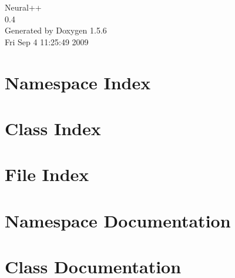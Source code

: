 \documentclass[a4paper]{book}
\begin{document}
\begin{titlepage}
\vspace*{7cm}
\begin{center}
{\Large Neural++ \\[1ex]\large 0.4 }\\
\vspace*{1cm}
{\large Generated by Doxygen 1.5.6}\\
\vspace*{0.5cm}
{\small Fri Sep 4 11:25:49 2009}\\
\end{center}
\end{titlepage}
\clearemptydoublepage
{}
\tableofcontents
\clearemptydoublepage
{}
\chapter{Namespace Index}

\chapter{Class Index}

\chapter{File Index}

\chapter{Namespace Documentation}


\chapter{Class Documentation}
























\end{document}
